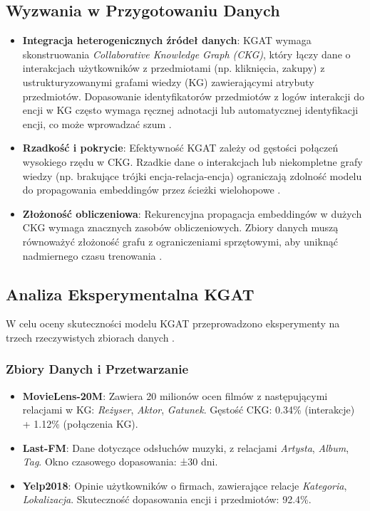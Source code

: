 \documentclass[a4paper,onecolumn]{LTJournalArticle}
\begin{document}
\subsection{Wyzwania w Przygotowaniu Danych}
\begin{itemize}
    \item \textbf{Integracja heterogenicznych źródeł danych}: KGAT wymaga skonstruowania \textit{Collaborative Knowledge Graph 
	(CKG)}, który łączy dane o interakcjach użytkowników z przedmiotami (np. kliknięcia, zakupy) z ustrukturyzowanymi grafami 
	wiedzy (KG) zawierającymi atrybuty przedmiotów. Dopasowanie identyfikatorów przedmiotów z logów interakcji do encji w KG 
	często wymaga ręcznej adnotacji lub automatycznej identyfikacji encji, co może wprowadzać szum \cite{wang2019kgat}.

    \item \textbf{Rzadkość i pokrycie}: Efektywność KGAT zależy od gęstości połączeń wysokiego rzędu w CKG. Rzadkie dane o 
	interakcjach lub niekompletne grafy wiedzy (np. brakujące trójki encja-relacja-encja) ograniczają zdolność modelu do 
	propagowania embeddingów przez ścieżki wielohopowe \cite{wang2019kgat}.
    
    \item \textbf{Złożoność obliczeniowa}: Rekurencyjna propagacja embeddingów w dużych CKG wymaga znacznych zasobów 
	obliczeniowych. Zbiory danych muszą równoważyć złożoność grafu z ograniczeniami sprzętowymi, aby uniknąć nadmiernego czasu 
	trenowania \cite{wang2019kgat}.
\end{itemize}

\subsection{Analiza Eksperymentalna KGAT}
W celu oceny skuteczności modelu KGAT przeprowadzono eksperymenty na trzech rzeczywistych zbiorach danych \cite{wang2019kgat}.

\subsubsection{Zbiory Danych i Przetwarzanie}
\begin{itemize}
    \item \textbf{MovieLens-20M}: Zawiera 20 milionów ocen filmów z następującymi relacjami w KG: \textit{Reżyser}, \textit{Aktor}, \textit{Gatunek}. Gęstość CKG: 0.34\% (interakcje) + 1.12\% (połączenia KG).
    \item \textbf{Last-FM}: Dane dotyczące odsłuchów muzyki, z relacjami \textit{Artysta}, \textit{Album}, \textit{Tag}. Okno czasowego dopasowania: ±30 dni.
    \item \textbf{Yelp2018}: Opinie użytkowników o firmach, zawierające relacje \textit{Kategoria}, \textit{Lokalizacja}. Skuteczność dopasowania encji i przedmiotów: 92.4\%.
\end{itemize}
\end{document}
